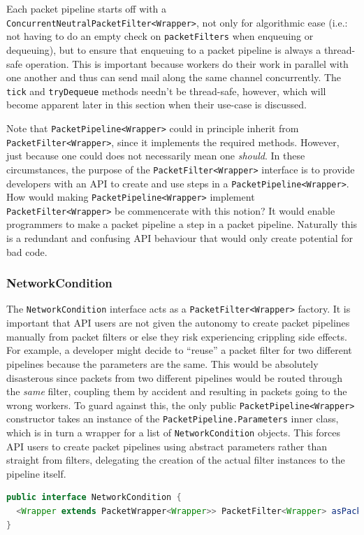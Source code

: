 Each packet pipeline starts off with a \texttt{ConcurrentNeutralPacketFilter<Wrapper>}, not only for algorithmic ease
(i.e.: not having to do an empty check on \texttt{packetFilters} when enqueuing or dequeuing), but to ensure that
enqueuing to a packet pipeline is always a thread-safe operation. This is important because workers do their work in
parallel with one another and thus can send mail along the same channel concurrently. The \texttt{tick} and
\texttt{tryDequeue} methods needn't be thread-safe, however, which will become apparent later in this section when
their use-case is discussed.

Note that \texttt{PacketPipeline<Wrapper>} could in principle inherit from \texttt{PacketFilter<Wrapper>}, since it
implements the required methods. However, just because one could does not necessarily mean one \emph{should}. In
these circumstances, the purpose of the \texttt{PacketFilter<Wrapper>} interface is to provide developers with an API
to create and use steps in a \texttt{PacketPipeline<Wrapper>}. How would making \texttt{PacketPipeline<Wrapper>}
implement \texttt{PacketFilter<Wrapper>} be commencerate with this notion? It would enable programmers to make a
packet pipeline a step in a packet pipeline. Naturally this is a redundant and confusing API behaviour that would
only create potential for bad code.

\subsubsection{NetworkCondition}

The \texttt{NetworkCondition} interface acts as a \texttt{PacketFilter<Wrapper>} factory. It is important that API
users are not given the autonomy to create packet pipelines manually from packet filters or else they risk
experiencing crippling side effects. For example, a developer might decide to ``reuse'' a packet filter for two
different pipelines because the parameters are the same. This would be absolutely disasterous since packets from two
different pipelines would be routed through the \emph{same} filter, coupling them by accident and resulting in packets
going to the wrong workers. To guard against this, the only public \texttt{PacketPipeline<Wrapper>} constructor takes
an instance of the \texttt{PacketPipeline.Parameters} inner class, which is in turn a wrapper for a list of
\texttt{NetworkCondition} objects. This forces API users to create packet pipelines using abstract parameters rather
than straight from filters, delegating the creation of the actual filter instances to the pipeline itself.
\begin{lstlisting}[language=Java,caption={The \texttt{NetworkCondition} interface without any of its presets.},
    label={code:network_condition_interface},captionpos=b]
public interface NetworkCondition {
  <Wrapper extends PacketWrapper<Wrapper>> PacketFilter<Wrapper> asPacketFilterStartingAt(LocalDateTime startTime);
}
\end{lstlisting}

